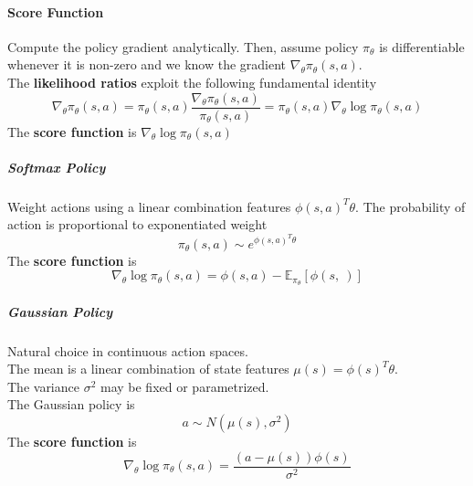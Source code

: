 \documentclass[10pt]{report}
\begin{document}
\paragraph{Score Function} Compute the policy gradient analytically. Then, assume policy $\pi_\theta$ is differentiable whenever it is non-zero and we know the gradient $\nabla_\theta\pi_\theta(s,a)$.\\
The \textbf{likelihood ratios} exploit the following fundamental identity
$$\nabla_\theta\pi_\theta(s,a)=\pi_\theta(s,a)\frac{\nabla_\theta\pi_\theta(s,a)}{\pi_\theta(s,a)} = \pi_\theta(s,a)\nabla_\theta\log\pi_\theta(s,a)$$
The \textbf{score function} is $\nabla_\theta\log\pi_\theta(s,a)$
\subparagraph{Softmax Policy} Weight actions using a linear combination features $\phi(s,a)^T\theta$. The probability of action is proportional to exponentiated weight $$\pi_\theta(s,a)\sim e^{\phi(s,a)^T\theta}$$
The \textbf{score function} is $$\nabla_\theta\log\pi_\theta(s,a)=\phi(s,a)-\mathbb{E}_{\pi_\theta}[\phi(s,\:)]$$
\subparagraph{Gaussian Policy} Natural choice in continuous action spaces.\\
The mean is a linear combination of state features $\mu(s) = \phi(s)^T\theta$.\\
The variance $\sigma^2$ may be fixed or parametrized.\\
The Gaussian policy is $$a\sim N(\mu(s),\sigma^2)$$
The \textbf{score function} is $$\nabla_\theta\log\pi_\theta(s,a)=\frac{(a-\mu(s))\phi(s)}{\sigma^2}$$
\end{document}
